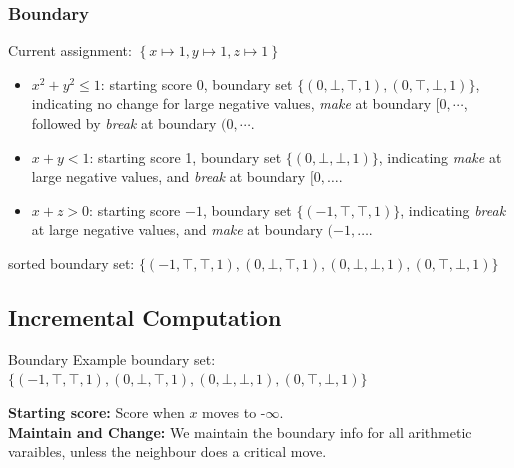 \begin{frame}
    \frametitle{Boundary}
    Current assignment: $\left\{ x\mapsto 1, y\mapsto 1, z\mapsto 1 \right\}$ \\
    \begin{itemize}
        \item $x^2+y^2\le 1$: starting score 0, boundary set $\{(0,\bot,\top,1), (0,\top,\bot,1)\}$, indicating no change for large negative values, \emph{make} at boundary $[0,\cdots$, followed by \emph{break} at boundary $(0,\cdots$.
        \item $x+y<1$: starting score 1, boundary set $\{(0,\bot,\bot,1)\}$, indicating \emph{make} at large negative values, and \emph{break} at boundary $[0,\dots$.
        \item $x+z>0$: starting score $-1$, boundary set $\{(-1,\top,\top,1)\}$, indicating \emph{break} at large negative values, and \emph{make} at boundary $(-1,\dots$.
    \end{itemize}
    sorted boundary set: $\{(-1,\top,\top,1),(0,\bot,\top,1),(0,\bot,\bot,1),(0,\top,\bot,1)\}$
\end{frame}

\subsection{Incremental Computation}

\begin{frame}{Boundary Example}
    boundary set: $\{(-1,\top,\top,1),(0,\bot,\top,1),(0,\bot,\bot,1),(0,\top,\bot,1)\}$
    \vspace{0.2cm}
    \begin{center}
    \end{center}

    \textbf{Starting score:} Score when $x$ moves to -$\infty$. \\
    \textbf{Maintain and Change:} We maintain the boundary info for all arithmetic varaibles, unless the neighbour does a critical move.
\end{frame}

